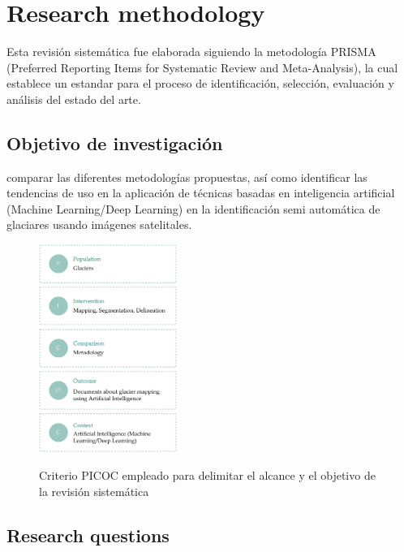 \documentclass{article}
\begin{document}

\section{Research methodology}

Esta revisión sistemática fue elaborada siguiendo la metodología PRISMA (Preferred Reporting Items for Systematic Review and Meta-Analysis), la cual establece un estandar para el proceso de identificación, selección, evaluación  y análisis del estado del arte.

\subsection{Objetivo de investigación}

comparar las diferentes metodologías propuestas, así como identificar las tendencias de uso en la aplicación de técnicas basadas en inteligencia artificial (Machine Learning/Deep Learning) en la identificación semi automática de glaciares usando imágenes satelitales.

\begin{figure}[H]
    \centering
    \includegraphics[width=0.4\textwidth]{images/picoc.pdf}
    \label{fig:picoc}
    \caption{Criterio PICOC empleado para delimitar el alcance y el objetivo de la revisión sistemática}
\end{figure}

\subsection{Research questions}
\end{document}
